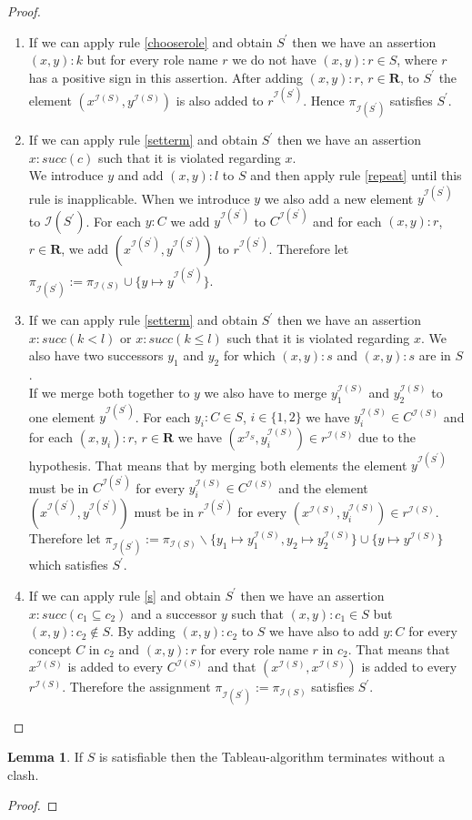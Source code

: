 \documentclass[a4paper,11pt]{scrartcl}
\theoremstyle{break}
\theoremstyle{definition}
\newtheorem{mylem}{Lemma}
\begin{document}
\begin{proof}
\begin{enumerate}
\item If we can apply rule \ref{chooserole} and obtain $S^\prime$ then we have an assertion $(x,y):k$ but for every role name $r$ we do not have $(x,y):r\in S$, where $r$ has a positive sign in this assertion. After adding $(x,y):r$, $r\in\mathbf{R}$, to $S^\prime$ the element $(x^{\mathcal{I}(S)},y^{\mathcal{I}(S)})$ is also added to $r^{\mathcal{I}(S^\prime)}$. Hence $\pi_{\mathcal{I}(S^\prime)}$ satisfies $S^\prime$.
\item If we can apply rule \ref{setterm} and obtain $S^\prime$ then we have an assertion $x:succ(c)$ such that it is violated regarding $x$.\\
We introduce $y$ and add $(x,y):l$ to $S$ and then apply rule \ref{repeat} until this rule is inapplicable. When we introduce $y$ we also add a new element $y^{\mathcal{I}(S^\prime)}$ to $\mathcal{I}(S^\prime)$. For each $y:C$ we add $y^{\mathcal{I}(S^\prime)}$ to $C^{\mathcal{I}(S^\prime)}$ and for each $(x,y):r$, $r\in\mathbf{R}$, we add $(x^{\mathcal{I}(S^\prime)},y^{\mathcal{I}(S^\prime)})$ to $r^{\mathcal{I}(S^\prime)}$. Therefore let $\pi_{\mathcal{I}(S^\prime)}:=\pi_{\mathcal{I}(S)}\cup \{y\mapsto y^{\mathcal{I}(S^\prime)}\}$.
\item If we can apply rule \ref{setterm} and obtain $S^\prime$ then we have an assertion $x:succ(k<l)$ or $x:succ(k\leq l)$ such that it is violated regarding $x$. We also have two successors $y_1$ and $y_2$ for which $(x,y):s$ and $(x,y):s$ are in $S$.\\
If we merge both together to $y$ we also have to merge $y_1^{\mathcal{I}(S)}$ and $y_2^{\mathcal{I}(S)}$ to one element $y^{\mathcal{I}(S^\prime)}$. For each $y_i:C\in S$, $i\in\{1,2\}$ we have $y_i^{\mathcal{I}(S)}\in C^{\mathcal{I}(S)}$ and for each $(x,y_i):r$, $r\in\mathbf{R}$ we have $(x^{\mathcal{I}_S},y_i^{\mathcal{I}(S)})\in r^{\mathcal{I}(S)}$ due to the hypothesis. That means that by merging both elements the element $y^{\mathcal{I}(S^\prime)}$ must be in $C^{\mathcal{I}(S^\prime)}$ for every $y_i^{\mathcal{I}(S)}\in C^{\mathcal{I}(S)}$ and the element $(x^{\mathcal{I}(S^\prime)},y^{\mathcal{I}(S^\prime)})$ must be in $r^{\mathcal{I}(S^\prime)}$ for every $(x^{\mathcal{I}(S)},y_i^{\mathcal{I}(S)})\in r^{\mathcal{I}(S)}$. Therefore let $\pi_{\mathcal{I}(S^\prime)}:=\pi_{\mathcal{I}(S)}\backslash\{y_1\mapsto y_1^{\mathcal{I}(S)}, y_2\mapsto y_2^{\mathcal{I}(S)}\}\cup\{y\mapsto y^{\mathcal{I}(S)}\}$ which satisfies $S^\prime$.
\item If we can apply rule \ref{s} and obtain $S^\prime$ then we have an assertion $x:succ(c_1\subseteq c_2)$ and a successor $y$ such that $(x,y):c_1\in S$ but $(x,y):c_2\notin S$. By adding $(x,y):c_2$ to $S$ we have also to add $y:C$ for every concept $C$ in $c_2$ and $(x,y):r$ for every role name $r$ in $c_2$. That means that $x^{\mathcal{I}(S)}$ is added to every $C^{\mathcal{I}(S)}$ and that $(x^{\mathcal{I}(S)},x^{\mathcal{I}(S)})$ is added to every $r^{\mathcal{I}(S)}$. Therefore the assignment $\pi_{\mathcal{I}(S^\prime)}:=\pi_{\mathcal{I}(S)}$ satisfies $S^\prime$.
\end{enumerate}
\end{proof}
\begin{mylem}
If $S$ is satisfiable then the Tableau-algorithm terminates without a clash.
\end{mylem}
\begin{proof}
\end{proof}
\normalem


\end{document}
